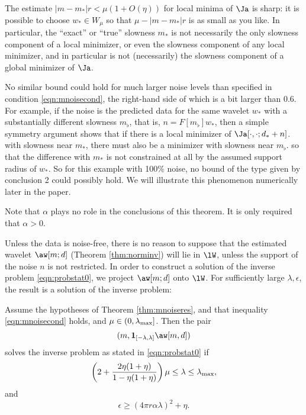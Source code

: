  The estimate $|m-m_*|r<\mu(1+O(\eta))$ for
local minima of $\Ja$ is sharp: it is possible to choose $w_* \in W_{\mu}$
so that $\mu - |m-m_*|r$ is as small as you like. In particular,
the ``exact'' or ``true'' slowness $m_*$ is not necessarily the only
slowness component of a local minimizer, or even the slowness
component of any local minimizer, and in particular
is not (necessarily) the slowness component of a global minimizer of $\Ja$.

 No similar bound could hold for much larger
noise levels than specified in condition \ref{eqn:mnoisecond}, the
right-hand side of which is a bit larger than 0.6. For example, if the noise is
the predicted data for the same wavelet $w_*$ with a substantially different
slowness $m_{\flat}$, that is, $n=F[m_{\flat}]w_*$, then a simple
symmetry argument shows that if there is a local minimizer of $\Ja[\cdot,\cdot;d_*+n]$. with
slowness near $m_*$,
there must also be a minimizer with slowness near $m_{\flat}$.
so that the difference with $m_*$ is not constrained at
all by the assumed support radius of $w_*$. So for this example with 100\% noise, no
bound of the type given by conclusion 2 could possibly hold. We will
illustrate this phenomenon numerically later in the paper.

 Note that $\alpha$ plays no role in the
conclusions of this theorem. It is only required that $\alpha >0$.

Unless the data is noise-free, there is no reason to suppose that the
estimated wavelet $\aw[m;d]$ (Theorem \ref{thm:norminv}) will lie in
$\lW$, unless the support of the noise $n$ is not restricted. In order
to construct a solution of the inverse problem \ref{eqn:probstat0}, we
project $\aw[m;d]$ onto $\lW$. For sufficiently large $\lambda,
\epsilon$, the result is a solution of the inverse problem:

\begin{theorem}
  \label{thm:ipnoisesuf}
  Assume the hypotheses of Theorem \ref{thm:mnoiseres}, and that
  inequality \ref{eqn:mnoisecond} holds, and $\mu \in
  (0,\lambda_{\rm max}]$. Then the pair
  \[
    (m,{\bf 1}_{[-\lambda,\lambda]}\aw[m,d])
  \]
  solves the inverse problem as stated in \ref{eqn:probstat0} if
  \begin{equation}
    \label{eqn:ipnoiselam}
    \left( 2+\frac{2\eta(1+\eta)}{1-\eta(1+\eta)}\right)\mu \le \lambda
    \le \lambda_{\rm max}, 
  \end{equation}
  and
  \begin{equation}
    \label{eqn:ipnoiseeps}
    \epsilon \ge (4 \pi r \alpha\lambda)^2+\eta. 
  \end{equation}    
\end{theorem}

